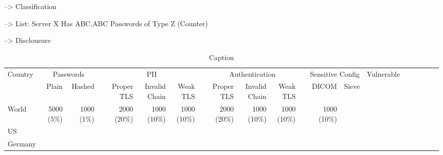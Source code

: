 --> Classification

--> List: Server X Has ABC.ABC Passwords of Type Z (Counter)

--> Disclousure



\begin{landscape}
\begin{table}[phtb]
\footnotesize
    \centering
    \begin{tabular}{lrrrrrrrrrrrrrrrrrrr}
         \hline
                 \multirow{2}{*}{Country}&\multicolumn{2}{c}{Passwords}                    && \multicolumn{3}{c}{PII} && \multicolumn{3}{c}{Authentication} && \multicolumn{2}{c}{Sensitive Config} &\multirow{2}{*}{Vulnerable} \\
                 \cline{2-3}\cline{5-7} \cline{9-11}\cline{13-14}
         & Plain & Hashed && Proper TLS & Invalid Chain & Weak TLS && Proper TLS & Invalid Chain & Weak TLS && DICOM & Sieve &&\\
         \hline
         World & 5000 (5\%) & 1000 (1\%) && 2000 (20\%) & 1000 (10\%)& 1000 (10\%)&&2000 (20\%) & 1000 (10\%)& 1000 (10\%) && 1000 (10\%)\\
         US \\
         Germany\\
         \hline
    \end{tabular}
    \caption{Caption}
    \label{tab:my_label}
\end{table}

\end{landscape}
